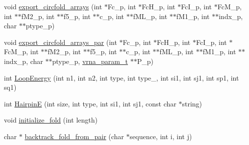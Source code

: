 \begin{DoxyCompactItemize}
\item 
void \mbox{\hyperlink{group__mfe__global__deprecated_ga04d5d639fd4473ca766436a9bae5665c}{export\+\_\+circfold\+\_\+arrays}} (int $\ast$Fc\+\_\+p, int $\ast$Fc\+H\+\_\+p, int $\ast$Fc\+I\+\_\+p, int $\ast$Fc\+M\+\_\+p, int $\ast$$\ast$f\+M2\+\_\+p, int $\ast$$\ast$f5\+\_\+p, int $\ast$$\ast$c\+\_\+p, int $\ast$$\ast$f\+M\+L\+\_\+p, int $\ast$$\ast$f\+M1\+\_\+p, int $\ast$$\ast$indx\+\_\+p, char $\ast$$\ast$ptype\+\_\+p)
\item 
void \mbox{\hyperlink{group__mfe__global__deprecated_ga004bb901e7fd2f8d5ae68f9530318ce1}{export\+\_\+circfold\+\_\+arrays\+\_\+par}} (int $\ast$Fc\+\_\+p, int $\ast$Fc\+H\+\_\+p, int $\ast$Fc\+I\+\_\+p, int $\ast$Fc\+M\+\_\+p, int $\ast$$\ast$f\+M2\+\_\+p, int $\ast$$\ast$f5\+\_\+p, int $\ast$$\ast$c\+\_\+p, int $\ast$$\ast$f\+M\+L\+\_\+p, int $\ast$$\ast$f\+M1\+\_\+p, int $\ast$$\ast$indx\+\_\+p, char $\ast$$\ast$ptype\+\_\+p, \mbox{\hyperlink{group__energy__parameters_ga8a69ca7d787e4fd6079914f5343a1f35}{vrna\+\_\+param\+\_\+t}} $\ast$$\ast$P\+\_\+p)
\item 
int \mbox{\hyperlink{group__mfe__global__deprecated_ga2163034a25c6115d894b199e97e03f6c}{Loop\+Energy}} (int n1, int n2, int type, int type\+\_, int si1, int sj1, int sp1, int sq1)
\item 
int \mbox{\hyperlink{group__mfe__global__deprecated_gab327ce11972f5ac069d52c8dedfdb700}{HairpinE}} (int size, int type, int si1, int sj1, const char $\ast$string)
\item 
void \mbox{\hyperlink{group__mfe__global__deprecated_gac3f0a28d9cb609d388b155445073fd20}{initialize\+\_\+fold}} (int length)
\item 
char $\ast$ \mbox{\hyperlink{group__mfe__global__deprecated_ga33c35bfd60df9d7a97aec72b887e6858}{backtrack\+\_\+fold\+\_\+from\+\_\+pair}} (char $\ast$sequence, int i, int j)
\end{DoxyCompactItemize}
